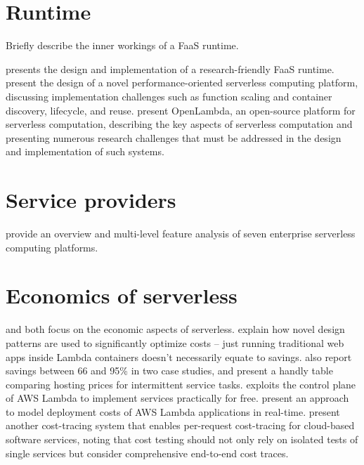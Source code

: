 \documentclass[utf8,english]{gradu3}
\begin{document}
\section{Runtime}

Briefly describe the inner workings of a FaaS runtime.

\textcite{spillner17snafu} presents the design and implementation of a research-friendly FaaS runtime. \textcite{mcgrath17implement} present the design of a novel performance-oriented serverless computing platform, discussing implementation challenges such as function scaling and container discovery, lifecycle, and reuse. \textcite{hendrickson16openlambda} present OpenLambda, an open-source platform for serverless computation, describing the key aspects of serverless computation and presenting numerous research challenges that must be addressed in the design and implementation of such systems.

\section{Service providers}

\textcite{lynn2017preliminary} provide an overview and multi-level feature analysis of seven enterprise serverless computing platforms.

\section{Economics of serverless}

\textcite{eivy2017wary} and \textcite{villamizar2016infrastructure} both focus on the economic aspects of serverless. \textcite{adzic2017serverless} explain how novel design patterns are used to significantly optimize costs -- just running traditional web apps inside Lambda containers doesn't necessarily equate to savings. \textcite{adzic2017serverless} also report savings between 66 and 95\% in two case studies, and present a handly table comparing hosting prices for intermittent service tasks. \textcite{spillner17exploiting} exploits the control plane of AWS Lambda to implement services practically for free. \textcite{leitner16modelcost} present an approach to model deployment costs of AWS Lambda applications in real-time. \textcite{kuhlenkamp17costradamus} present another cost-tracing system that enables per-request cost-tracing for cloud-based software services, noting that cost testing should not only rely on isolated tests of single services but consider comprehensive end-to-end cost traces.
\end{document}
